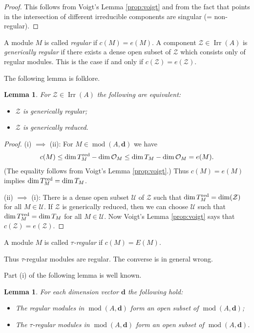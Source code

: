\documentclass[12pt,reqno]{amsart}
\newtheorem{Lem}[Thm]{Lemma}
\theoremstyle{definition}
\newcommand{\cO}{{\mathcal O}}
\newcommand{\bd}{\mathbf{d}}
\newcommand{\md}{\operatorname{mod}}
\newcommand{\irr}{\operatorname{Irr}}
\newcommand{\calU}{\mathcal{U}}
\newcommand{\calZ}{\mathcal{Z}}
\begin{document}
\begin{proof}
This follows from Voigt's Lemma \ref{prop:voigt} and from the fact that
points in the intersection of different irreducible components
are singular (= non-regular).
\end{proof}


A module $M$ is called \emph{regular} if $c(M) = e(M)$.
A component $\calZ \in \irr(A)$ is \emph{generically regular} if
there exists a dense open subset of $\calZ$ which consists
only of regular modules.
This is the case if and only if
$c(\calZ) = e(\calZ)$.

The following lemma is folklore.

\begin{Lem}
For $\calZ \in \irr(A)$ the following are equivalent:
\begin{itemize}\itemsep2mm

\item[(i)]
$\calZ$ is generically regular;

\item[(ii)]
$\calZ$ is generically reduced.

\end{itemize}
\end{Lem}

\begin{proof}
(i) $\implies$ (ii):
For $M \in \md(A,\bd)$
we have
$$
c(M) \le \dim T_M^{\rm red} -\dim \cO_M \le \dim T_M -
\dim \cO_M = e(M).
$$
(The equality follows from Voigt's Lemma \ref{prop:voigt}.)
Thus $c(M) = e(M)$ implies $\dim T_M^{\rm red} = \dim T_M$.

(ii) $\implies$ (i):
There is a dense open subset $\calU$ of
$\calZ$ such that $\dim T_M^{\rm red} = \dim(\calZ)$
for all $M \in \calU$.
If $\calZ$ is generically reduced, then
we can choose $\calU$ such that
$\dim T_M^{\rm red} = \dim T_M$ for all $M \in \calU$.
Now Voigt's Lemma \ref{prop:voigt} says that
$c(\calZ) = e(\calZ)$.
\end{proof}

A module  $M$ is
called
\emph{$\tau$-regular} if $c(M) = E(M)$.

Thus $\tau$-regular modules are regular.
The converse is in general wrong.

Part (i) of the following lemma is well known.

\begin{Lem}\label{lem:regularopen}
For each dimension vector $\bd$ the following hold:
\begin{itemize}\itemsep2mm

\item[(i)]
The regular modules in $\md(A,\bd)$ form an open subset of $\md(A,\bd)$;

\item[(ii)]
The $\tau$-regular modules in $\md(A,\bd)$
form an open subset of $\md(A,\bd)$.

\end{itemize}
\end{Lem}
\end{document}
